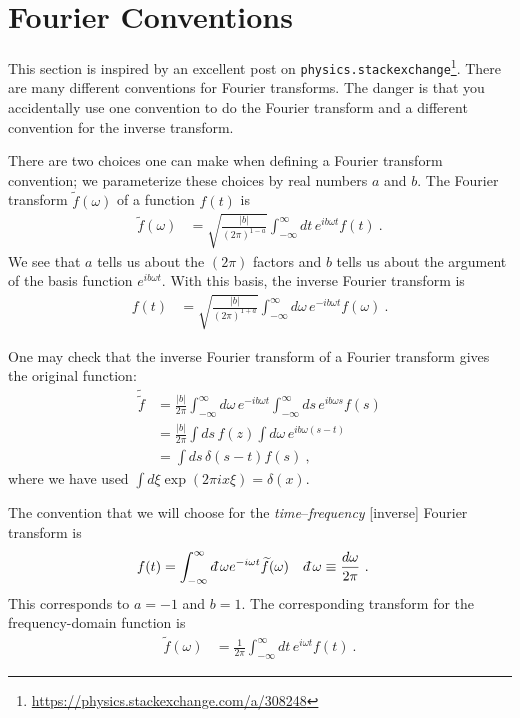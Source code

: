 
\section{Fourier Conventions}

This section is inspired by an excellent post on \texttt{physics.stackexchange}\footnote{\url{https://physics.stackexchange.com/a/308248}}. There are many different conventions for Fourier transforms. The danger is that you accidentally use one convention to do the Fourier transform and a different convention for the inverse transform. 

There are two choices one can make when defining a Fourier transform convention; we parameterize these choices by real numbers $a$ and $b$. The Fourier transform $\tilde f(\omega)$ of a function $f(t)$ is
\begin{align}
	\tilde f(\omega)
	&= 
	\sqrt{\frac{|b|}{(2\pi)^{1-a}}}
	\int_{-\infty}^\infty dt\, e^{ib\omega t} f(t) \ .
\end{align}
We see that $a$ tells us about the $(2\pi)$ factors and $b$ tells us about the argument of the basis function $e^{ib\omega t}$. With this basis, the inverse Fourier transform is 
\begin{align}
	f(t)&=
	\sqrt{\frac{|b|}{(2\pi)^{1+a}}}
	\int_{-\infty}^\infty d\omega\, e^{-ib\omega t} f(\omega) \ .
\end{align}

One may check that the inverse Fourier transform of a Fourier transform gives the original function:
\begin{align}
	\tilde{\tilde f} &=
	\frac{|b|}{2\pi}
	\int_{-\infty}^\infty d\omega\, e^{-ib\omega t}
	\int_{-\infty}^{\infty}
	ds\, e^{ib\omega s} f(s)
	\\
	&= 
	\frac{|b|}{2\pi}
	\int ds\, f(z) \int d\omega \, e^{ib\omega(s-t)}
	\\
	&= \int ds\, \delta(s-t) f(s) \ ,
\end{align}
where we have used $\int d\xi \exp(2\pi i x\xi) = \delta(x)$. 

The convention that we will choose for the \emph{time}--\emph{frequency} [inverse] Fourier transform is
\begin{align}
	f(t) &= \int_{-\infty}^{\infty} \dbar\omega e^{-i\omega t} \tilde f(\omega)
	&
	\dbar \omega &\equiv\frac{d\omega}{2\pi} \ .
\end{align}
This corresponds to $a=-1$ and $b=1$. The corresponding transform for the frequency-domain function is
\begin{align}
	\tilde f(\omega) &= 
	\frac{1}{2\pi}
	\int_{-\infty}^\infty dt\, e^{i\omega t} f(t) \ .
\end{align}



